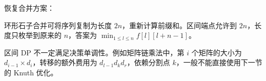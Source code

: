 恢复合并方案：


环形石子合并可将序列复制为长度 $2n$，重新计算前缀和。区间端点允许到 $2n$，长度只枚举到原来的 $n$，答案为 $\min_{1\le l\le n}f[l][l+n-1]$。

区间 DP 不一定满足决策单调性。例如矩阵链乘法中，第 $i$ 个矩阵的大小为 $d_{i-1}\times d_i$，转移的额外费用为 $d_{l-1}d_kd_r$，依赖分割点 $k$，一般不能直接使用下一节的 Knuth 优化。
